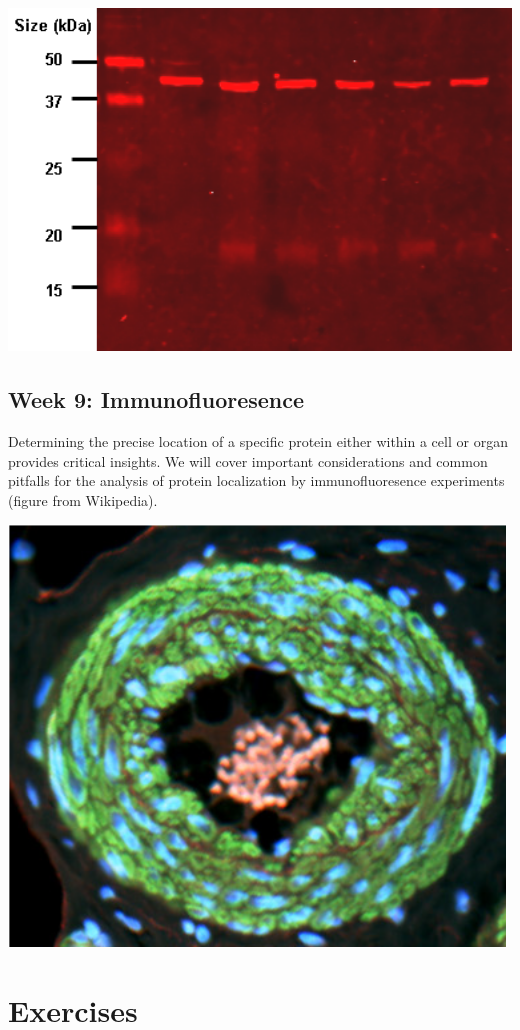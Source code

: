 \documentclass[]{book}
\begin{document}
\begin{center}\includegraphics[width=5.75in]{classes/images/western} \end{center}

\hypertarget{week-9-immunofluoresence}{%
\section{Week 9: Immunofluoresence}\label{week-9-immunofluoresence}}

Determining the precise location of a specific protein either within a cell or organ provides critical insights. We will cover important considerations and common pitfalls for the analysis of protein localization by immunofluoresence experiments (figure from Wikipedia).

\begin{center}\includegraphics[width=5.19in]{classes/images/IF} \end{center}

\hypertarget{exercises}{%
\chapter{Exercises}\label{exercises}}


\end{document}
